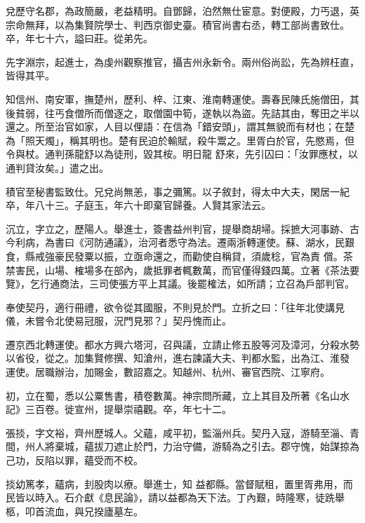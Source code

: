 \begin{pinyinscope}
 兌歷守名郡，為政簡嚴，老益精明。自鄧歸，泊然無仕宦意。對便殿，力丐退，英宗命無拜，以為集賢院學士、判西京御史臺。積官尚書右丞，轉工部尚書致仕。卒，年七十六，謚曰莊。從弟先。



 先字淵宗，起進士，為虔州觀察推官，攝吉州永新令。兩州俗尚訟，先為辨枉直，皆得其平。



 知信州、南安軍，撫楚州，歷利、梓、江東、淮南轉運使。壽春民陳氏施僧田，其後貧弱，往丐食僧所而僧逐之，取僧園中筍，遂執以為盜。先詰其由，奪田之半以還之。所至治官如家，人目以俚語：在信為「錯安頭」，謂其無貌而有材也；在楚為「照天燭」，稱其明也。楚有民迫於輸賦，殺牛鬻之。里胥白於官，先愍焉，但令與杖。通判孫龍舒以為徒刑，毀其桉。明日龍
 舒來，先引囚曰：「汝罪應杖，以通判貸汝矣。」遣之出。



 積官至秘書監致仕。兄兌尚無恙，事之彌篤。以子敘封，得太中大夫，閑居一紀卒，年八十三。子庭玉，年六十即棄官歸養。人賢其家法云。



 沉立，字立之，歷陽人。舉進士，簽書益州判官，提舉商胡埽。採摭大河事跡、古今利病，為書曰《河防通議》，治河者悉守為法。遷兩浙轉運使。蘇、湖水，民艱食，縣戒強豪民發粟以振，立亟命還之，而勸使自稱貸，須歲稔，官為責
 償。茶禁害民，山場、榷場多在部內，歲抵罪者輒數萬，而官僅得錢四萬。立著《茶法要覽》，乞行通商法，三司使張方平上其議。後罷榷法，如所請；立召為戶部判官。



 奉使契丹，適行冊禮，欲令從其國服，不則見於門。立折之曰：「往年北使講見儀，未嘗令北使易冠服，況門見邪？」契丹愧而止。



 遷京西北轉運使。都水方興六塔河，召與議，立請止修五股等河及漳河，分殺水勢以省役，從之。加集賢修撰、知滄州，進右諫議大夫、判都水監，出為江、淮發
 運使。居職辦治，加賜金，數詔嘉之。知越州、杭州、審官西院、江寧府。



 初，立在蜀，悉以公粟售書，積卷數萬。神宗問所藏，立上其目及所著《名山水記》三百卷。徙宣州，提舉崇禧觀。卒，年七十二。



 張掞，字文裕，齊州歷城人。父蘊，咸平初，監淄州兵。契丹入寇，游騎至淄、青間，州人將棄城，蘊拔刀遮止於門，力治守備，游騎為之引去。郡守愧，始謀掠為己功，反陷以罪，蘊受而不校。



 掞幼篤孝，蘊病，刲股肉以療。舉進士，知
 益都縣。當督賦租，置里胥弗用，而民皆以時入。石介獻《息民論》，請以益都為天下法。丁內艱，時隆寒，徒跣舉柩，叩首流血，與兄揆廬墓左。




\end{pinyinscope}
